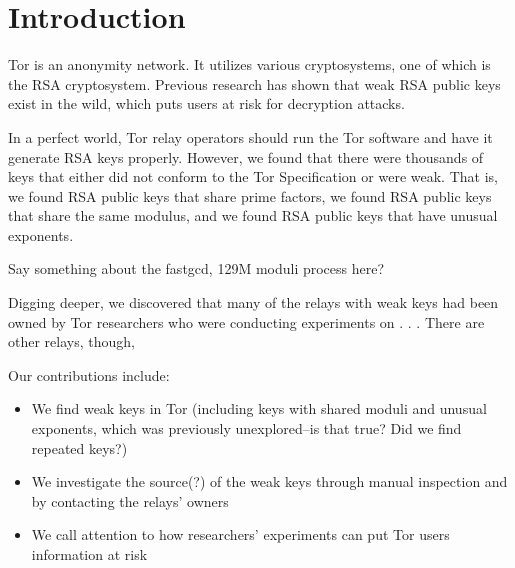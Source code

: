 \section{Introduction}
Tor is an anonymity network.  It utilizes various cryptosystems, 
one of which is the RSA cryptosystem.  Previous research has 
shown that weak RSA public keys exist in the wild, which puts users at 
risk for decryption attacks.  

In a perfect world, Tor relay operators should run the Tor software and have it 
generate RSA keys properly. However, we found that there were thousands of keys 
that either did not conform to the Tor Specification or were weak.  That is, we 
found RSA public keys that share prime factors, we found RSA public keys that 
share the same modulus, and we found RSA public keys that have unusual exponents.

Say something about the fastgcd, 129M moduli process here?

Digging deeper, we discovered that many of the relays with weak keys had been owned 
by Tor researchers who were conducting experiments on . . . There are other 
relays, though, 

Our contributions include:
\begin{itemize}
  \item We find weak keys in Tor (including keys with shared moduli 
    and unusual exponents, which was previously unexplored--is that true?
    Did we find repeated keys?)
  \item We investigate the source(?) of the weak keys through manual inspection and by 
    contacting the relays' owners
  \item We call attention to how researchers' experiments can put Tor users
    information at risk
\end{itemize}
